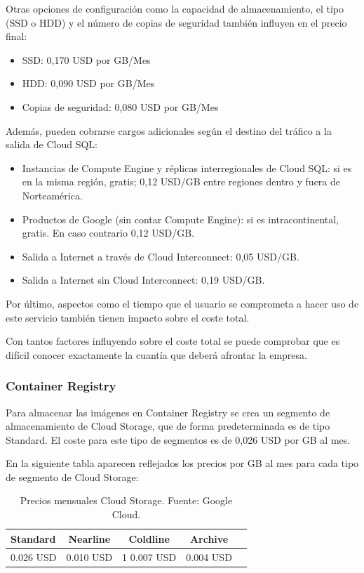 Otras opciones de configuración como la capacidad de almacenamiento, el tipo (SSD o HDD) y el número de copias de seguridad también influyen en el precio final:

\begin{itemize}
    \item SSD: 0,170 USD por GB/Mes
    \item HDD: 0,090 USD por GB/Mes
    \item Copias de seguridad: 0,080 USD por GB/Mes
\end{itemize}

Además, pueden cobrarse cargos adicionales según el destino del tráfico a la salida de Cloud SQL: 

\begin{itemize}
    \item Instancias de Compute Engine y réplicas interregionales de Cloud SQL: si es en la misma región, gratis; 0,12 USD/GB entre regiones dentro y fuera de Norteamérica.
    \item Productos de Google (sin contar Compute Engine): si es intracontinental, gratis. En caso contrario 0,12 USD/GB.
    \item Salida a Internet a través de Cloud Interconnect: 0,05 USD/GB.
    \item Salida a Internet sin Cloud Interconnect: 0,19 USD/GB.
\end{itemize}

Por último, aspectos como el tiempo que el usuario se comprometa a hacer uso de este servicio también tienen impacto sobre el coste total. 

Con tantos factores influyendo sobre el coste total se puede comprobar que es difícil conocer exactamente la cuantía que deberá afrontar la empresa.

\subsubsection{Container Registry}

Para almacenar las imágenes en Container Registry se crea un segmento de almacenamiento de Cloud Storage, que de forma predeterminada es de tipo Standard. El coste para este tipo de segmentos es de 0,026 USD por GB al mes. 

\newpage

En la siguiente tabla aparecen reflejados los precios por GB al mes para cada tipo de segmento de Cloud Storage:

\begin{table} [htbp]
	\centering
	\begin{tabular}{l c c c c}
		\textbf{Standard} & \textbf{Nearline} & \textbf{Coldline} & \textbf{Archive} \\ \hline
         0.026 USD & 0.010 USD & 1 0.007 USD & 0.004 USD \\
	\end{tabular}
	\centering
	\caption{\label{tab:costeCloudStorage}Precios mensuales Cloud Storage. Fuente: Google Cloud.}
\end{table}

